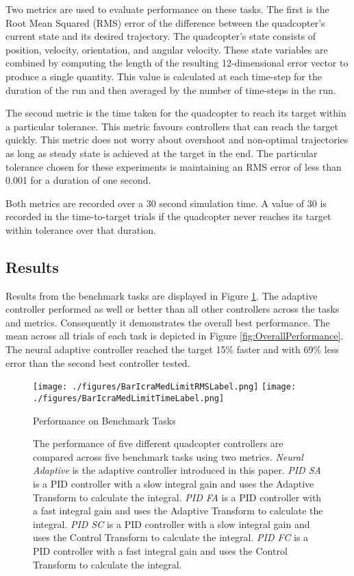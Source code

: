 \documentclass[letterpaper, 10 pt, conference]{ieeeconf}  %
\begin{document}
Two metrics are used to evaluate performance on these tasks. 
The first is the Root Mean Squared (RMS) error of the difference between the quadcopter's current state and its desired trajectory.
The quadcopter's state consists of position, velocity, orientation, and angular velocity.
These state variables are combined by computing the length of the resulting 12-dimensional error vector to produce a single quantity.
This value is calculated at each time-step for the duration of the run and then averaged by the number of time-steps in the run.

The second metric is the time taken for the quadcopter to reach its target within a particular tolerance. 
This metric favours controllers that can reach the target quickly.
This metric does not worry about overshoot and non-optimal trajectories as long as steady state is achieved at the target in the end.
The particular tolerance chosen for these experiments is maintaining an RMS error of less than 0.001 for a duration of one second.

Both metrics are recorded over a 30 second simulation time.
A value of 30 is recorded in the time-to-target trials if the quadcopter never reaches its target within tolerance over that duration.

\subsection{Results}

Results from the benchmark tasks are displayed in Figure \ref{fig:Benchmarks}.
The adaptive controller performed as well or better than all other controllers across the tasks and metrics.
Consequently it demonstrates the overall best performance.
The mean across all trials of each task is depicted in Figure \ref{fig:OverallPerformance}.
The neural adaptive controller reached the target 15\% faster and with 69\% less error than the second best controller tested.

\begin{figure}
\centering
\texttt{[image: ./figures/BarIcraMedLimitRMSLabel.png]}
\texttt{[image: ./figures/BarIcraMedLimitTimeLabel.png]}
\caption{Performance on Benchmark Tasks}
\label{fig:Benchmarks}
\captionsetup{singlelinecheck=off,font=footnotesize}
\caption*{The performance of five different quadcopter controllers are compared across five benchmark tasks using two metrics. \textit{Neural Adaptive} is the adaptive controller introduced in this paper. \textit{PID SA} is a PID controller with a slow integral gain and uses the Adaptive Transform to calculate the integral. \textit{PID FA} is a PID controller with a fast integral gain and uses the Adaptive Transform to calculate the integral. \textit{PID SC} is a PID controller with a slow integral gain and uses the Control Transform to calculate the integral. \textit{PID FC} is a PID controller with a fast integral gain and uses the Control Transform to calculate the integral.}
\end{figure}
\end{document}
